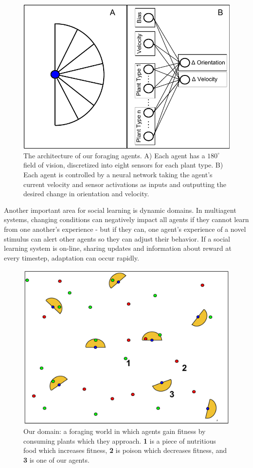 \documentclass{acm_proc_article-sp}
\begin{document}
\begin{figure}
  \centering
    \includegraphics[scale=.65]{foraging_agent_architecture.pdf}
  \caption{The architecture of our foraging agents. A) Each agent has a $180^{\circ}$ field of vision, discretized into eight sensors for each plant type. B) Each agent is controlled by a neural network taking the agent's current velocity and sensor activations as inputs and outputting the desired change in orientation and velocity.}
  \label{fig:agent-architecture}
\end{figure}

Another important area for social learning is dynamic domains. In multiagent systems, changing conditions can negatively impact all agents if they cannot learn from one another's experience - but if they can, one agent's experience of a novel stimulus can alert other agents so they can adjust their behavior. If a social learning system is on-line, sharing updates and information about reward at every timestep, adaptation can occur rapidly.

\begin{figure}
  \centering
    \includegraphics[scale=.3]{world.pdf}
  \caption{Our domain: a foraging world in which agents gain fitness by consuming plants which they approach.  \textbf{1} is a piece of nutritious food which increases fitness, \textbf{2} is poison which decreases fitness, and \textbf{3} is one of our agents.}
  \label{fig:foraging-world}
\end{figure}
\end{document}
